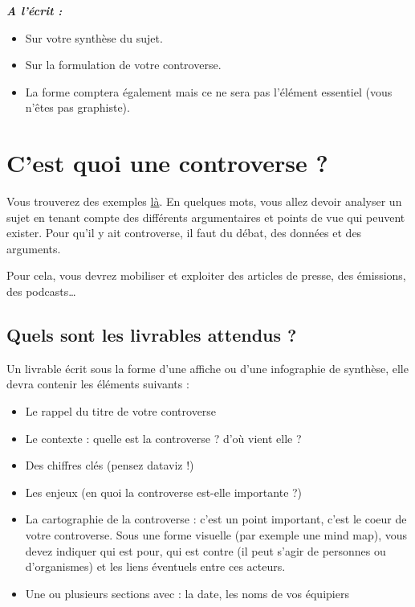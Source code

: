 \documentclass[
  letterpaper,
  DIV=11,
  numbers=noendperiod]{scrreprt}
\begin{document}
\textbf{\emph{A l'écrit :}}

\begin{itemize}
\item
  Sur votre synthèse du sujet.
\item
  Sur la formulation de votre controverse.
\item
  La forme comptera également mais ce ne sera pas l'élément essentiel
  (vous n'êtes pas graphiste).
\end{itemize}

\hypertarget{cest-quoi-une-controverse}{%
\section{C'est quoi une controverse ?}\label{cest-quoi-une-controverse}}

Vous trouverez des exemples
\href{https://www.controverses-esiee.fr/archive/}{là}. En quelques mots,
vous allez devoir analyser un sujet en tenant compte des différents
argumentaires et points de vue qui peuvent exister. Pour qu'il y ait
controverse, il faut du débat, des données et des arguments.

Pour cela, vous devrez mobiliser et exploiter des articles de presse,
des émissions, des podcasts\ldots{}

\hypertarget{quels-sont-les-livrables-attendus}{%
\subsection{Quels sont les livrables attendus
?}\label{quels-sont-les-livrables-attendus}}

Un livrable écrit sous la forme d'une affiche ou d'une infographie de
synthèse, elle devra contenir les éléments suivants :

\begin{itemize}
\item
  Le rappel du titre de votre controverse
\item
  Le contexte : quelle est la controverse ? d'où vient elle ?
\item
  Des chiffres clés (pensez dataviz !)
\item
  Les enjeux (en quoi la controverse est-elle importante ?)
\item
  La cartographie de la controverse : c'est un point important, c'est le
  coeur de votre controverse. Sous une forme visuelle (par exemple une
  mind map), vous devez indiquer qui est pour, qui est contre (il peut
  s'agir de personnes ou d'organismes) et les liens éventuels entre ces
  acteurs.
\item
  Une ou plusieurs sections avec : la date, les noms de vos équipiers
\end{itemize}
\end{document}
